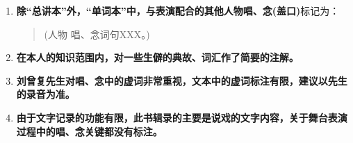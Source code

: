 {\begin{enumerate}
\begin{enumerate}
\def\labelenumi{\arabic{enumi}.}
\item
  每个剧目中凡有出入的唱、念词句标注为：

\begin{quote}
	\underline{\textrm{XX}词1}~({\akai 或}:~\textrm{XX}词2；~\textrm{XX}词3；$\cdots{}\cdots${})
\end{quote}
\begin{quote}
	\underline{\textrm{XX}句1}~({\akai 或}:~\textrm{XX}句2~{\akai 或}:~\textrm{XX}句3；$\cdots{}\cdots${})
\end{quote}

\def\labelenumi{\arabic{enumi}.}
\setcounter{enumi}{1}
\item
  每个剧目中可不念或某些衬字的唱、念标注为：

\begin{quote}
	(\textrm{XX}词句)
\end{quote}
\end{enumerate}

\def\labelenumi{\arabic{enumi}.}
\setcounter{enumi}{2}
\item
  \textbf{除``总讲本''外，``单词本''中，与表演配合的其他人物唱、念(盖口)}标记为：
\begin{quote}
	(人物\hspace{30pt} 唱、念词句\textrm{XXX}。)
\end{quote}
\item
  \textbf{在本人的知识范围内，对一些生僻的典故、词汇作了简要的注解。}
\item
  \textbf{刘曾复先生对唱、念中的虚词非常重视，文本中的虚词标注有限，建议以先生的录音为准。}
\item
  \textbf{由于文字记录的功能有限，此书辑录的主要是说戏的文字内容，关于舞台表演过程中的唱、念关键都没有标注。}
\end{enumerate}
}
